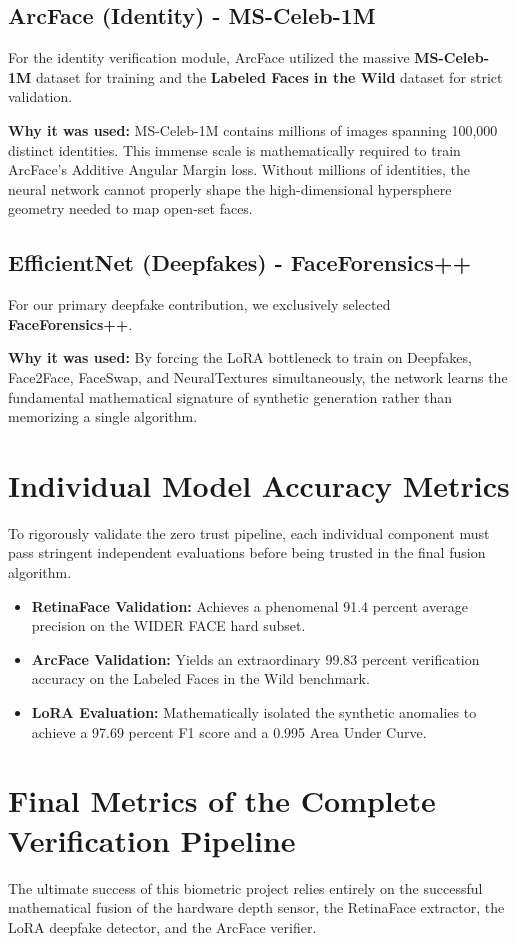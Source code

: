 \documentclass[12pt,a4paper]{report}
\begin{document}
\subsection{ArcFace (Identity) - MS-Celeb-1M}
For the identity verification module, ArcFace utilized the massive \textbf{MS-Celeb-1M} dataset for training and the \textbf{Labeled Faces in the Wild} dataset for strict validation.

\textbf{Why it was used:} MS-Celeb-1M contains millions of images spanning 100,000 distinct identities. This immense scale is mathematically required to train ArcFace's Additive Angular Margin loss. Without millions of identities, the neural network cannot properly shape the high-dimensional hypersphere geometry needed to map open-set faces.

\subsection{EfficientNet (Deepfakes) - FaceForensics++}
For our primary deepfake contribution, we exclusively selected \textbf{FaceForensics++}.

\textbf{Why it was used:} By forcing the LoRA bottleneck to train on Deepfakes, Face2Face, FaceSwap, and NeuralTextures simultaneously, the network learns the fundamental mathematical signature of synthetic generation rather than memorizing a single algorithm.

\section{Individual Model Accuracy Metrics}
To rigorously validate the zero trust pipeline, each individual component must pass stringent independent evaluations before being trusted in the final fusion algorithm.

\begin{itemize}
    \item \textbf{RetinaFace Validation:} Achieves a phenomenal 91.4 percent average precision on the WIDER FACE hard subset.
    \item \textbf{ArcFace Validation:} Yields an extraordinary 99.83 percent verification accuracy on the Labeled Faces in the Wild benchmark.
    \item \textbf{LoRA Evaluation:} Mathematically isolated the synthetic anomalies to achieve a 97.69 percent F1 score and a 0.995 Area Under Curve.
\end{itemize}

\section{Final Metrics of the Complete Verification Pipeline}
The ultimate success of this biometric project relies entirely on the successful mathematical fusion of the hardware depth sensor, the RetinaFace extractor, the LoRA deepfake detector, and the ArcFace verifier. 
\end{document}
